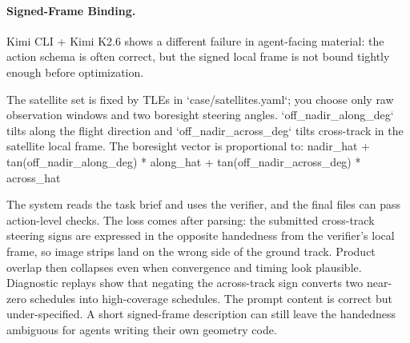 \documentclass[11pt]{article}
\newenvironment{promptblock}
  {\VerbatimEnvironment\par\smallskip\Needspace{10\baselineskip}\noindent\begin{promptblockinner}}
  {\end{promptblockinner}\par\smallskip}
\begin{document}
\paragraph{Signed-Frame Binding.} Kimi CLI + Kimi K2.6 shows a different failure in agent-facing material: the action schema is often correct, but the signed local frame is not bound tightly enough before optimization.
\begin{promptblock}
The satellite set is fixed by TLEs in `case/satellites.yaml`; you choose only
raw observation windows and two boresight steering angles.
`off_nadir_along_deg` tilts along the flight direction and
`off_nadir_across_deg` tilts cross-track in the satellite local frame.
The boresight vector is proportional to:
nadir_hat
+ tan(off_nadir_along_deg) * along_hat
+ tan(off_nadir_across_deg) * across_hat
\end{promptblock}
The system reads the task brief and uses the verifier, and the final files can pass action-level checks. The loss comes after parsing: the submitted cross-track steering signs are expressed in the opposite handedness from the verifier's local frame, so image strips land on the wrong side of the ground track. Product overlap then collapses even when convergence and timing look plausible. Diagnostic replays show that negating the across-track sign converts two near-zero schedules into high-coverage schedules. The prompt content is correct but under-specified. A short signed-frame description can still leave the handedness ambiguous for agents writing their own geometry code.
\end{document}
